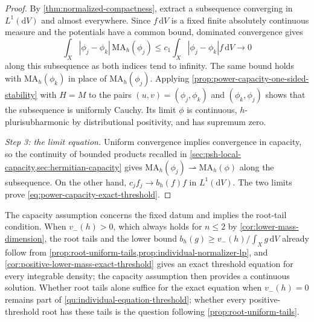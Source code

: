 \begin{proof}
By \cref{thm:normalized-compactness}, extract a subsequence converging in $L^1(\mathrm dV)$ and almost everywhere. Since $f\,\mathrm dV$ is a fixed finite absolutely continuous measure and the potentials have a common bound, dominated convergence gives
\[
 \int_X|\phi_j-\phi_k|\,\mathrm{MA}_h(\phi_j)
 \leq c_1\int_X|\phi_j-\phi_k|f\,\mathrm dV\longrightarrow0
\]
along this subsequence as both indices tend to infinity. The same bound holds with $\mathrm{MA}_h(\phi_k)$ in place of $\mathrm{MA}_h(\phi_j)$. Applying \cref{prop:power-capacity-one-sided-stability} with $H=M$ to the pairs $(u,v)=(\phi_j,\phi_k)$ and $(\phi_k,\phi_j)$ shows that the subsequence is uniformly Cauchy. Its limit $\phi$ is continuous, $h$-plurisubharmonic by distributional positivity, and has supremum zero.

\emph{Step 3: the limit equation.} Uniform convergence implies convergence in capacity, so the continuity of bounded products recalled in \cref{sec:psh-local-capacity,sec:hermitian-capacity} gives $\mathrm{MA}_h(\phi_j)\rightharpoonup\mathrm{MA}_h(\phi)$ along the subsequence. On the other hand, $c_jf_j\to b_h(f)f$ in $L^1(\mathrm dV)$. The two limits prove \eqref{eq:power-capacity-exact-threshold}.
\end{proof}

The capacity assumption concerns the fixed datum and implies the root-tail condition. When $v_-(h)>0$, which always holds for $n\leq2$ by \cref{cor:lower-mass-dimension}, the root tails and the lower bound $b_h(g)\geq v_-(h)/\int_Xg\,\mathrm dV$ already follow from \cref{prop:root-uniform-tails,prop:individual-normalizer-lp}, and \cref{cor:positive-lower-mass-exact-threshold} gives an exact threshold equation for every integrable density; the capacity assumption then provides a continuous solution. Whether root tails alone suffice for the exact equation when $v_-(h)=0$ remains part of \cref{qu:individual-equation-threshold}; whether every positive-threshold root has these tails is the question following \cref{prop:root-uniform-tails}.
